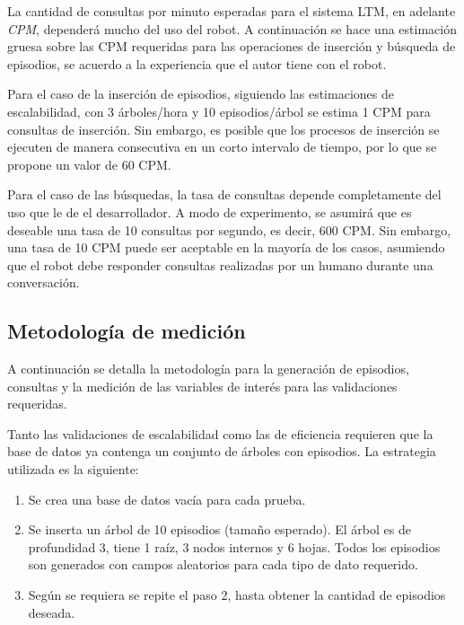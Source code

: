 La cantidad de consultas por minuto esperadas para el sistema LTM, en adelante \textit{CPM}, dependerá mucho del uso del robot. A continuación se hace una estimación gruesa sobre las CPM requeridas para las operaciones de inserción y búsqueda de episodios, se acuerdo a la experiencia que el autor tiene con el robot.

Para el caso de la inserción de episodios, siguiendo las estimaciones de escalabilidad, con 3 árboles/hora y 10 episodios/árbol se estima 1 CPM para consultas de inserción. Sin embargo, es posible que los procesos de inserción se ejecuten de manera consecutiva en un corto intervalo de tiempo, por lo que se propone un valor de 60 CPM.

Para el caso de las búsquedas, la tasa de consultas depende completamente del uso que le de el desarrollador. A modo de experimento, se asumirá que es deseable una tasa de 10 consultas por segundo, es decir, 600 CPM. Sin embargo, una tasa de 10 CPM puede ser aceptable en la mayoría de los casos, asumiendo que el robot debe responder consultas realizadas por un humano durante una conversación.

\subsection{Metodología de medición}

A continuación se detalla la metodología para la generación de episodios, consultas y la medición de las variables de interés para las validaciones requeridas.

Tanto las validaciones de escalabilidad como las de eficiencia requieren que la base de datos ya contenga un conjunto de árboles con episodios. La estrategia utilizada es la siguiente:
\begin{enumerate}
\item Se crea una base de datos vacía para cada prueba.
\item Se inserta un árbol de 10 episodios (tamaño esperado). El árbol es de profundidad 3, tiene 1 raíz, 3 nodos internos y 6 hojas. Todos los episodios son generados con campos aleatorios para cada tipo de dato requerido.
\item Según se requiera se repite el paso 2, hasta obtener la cantidad de episodios deseada.
\end{enumerate}

